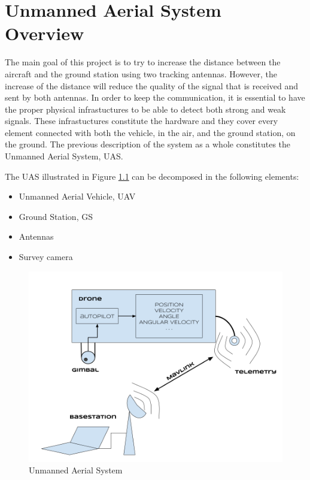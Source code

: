 \chapter{Unmanned Aerial System Overview}\label{ch:uas}

The main goal of this project is to try to increase the distance between the aircraft and the ground station using two tracking antennas. However, the increase of the distance will reduce the quality of the signal that is received and sent by both antennas. In order to keep the communication, it is essential to have the proper physical infrastuctures to be able to detect both strong and weak signals. These infrastuctures constitute the hardware and they cover every element connected with both the vehicle, in the air, and the ground station, on the ground. The previous description of the system as a whole constitutes the Unmanned Aerial System, UAS.

The UAS illustrated in Figure \ref{fig:uas} can be decomposed in the following elements:
\begin{itemize}
	\item Unmanned Aerial Vehicle, UAV
	\item Ground Station, GS
	\item Antennas
	\item Survey camera
\end{itemize}


\begin{figure}[H]
	\centering
	\includegraphics[scale=0.33]{figures/uas.png}
	\caption{Unmanned Aerial System}
	\label{fig:uas}
\end{figure}

